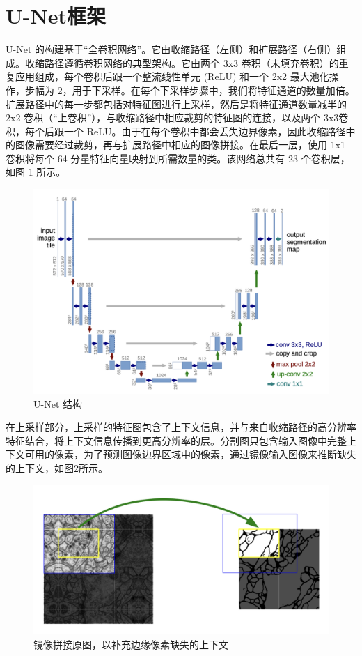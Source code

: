 \documentclass[letterpaper, 10pt, conference, twoside]{ieeeconf}
\begin{document}
\section{U-Net框架}
U-Net 的构建基于“全卷积网络”。它由收缩路径（左侧）和扩展路径（右侧）组成。收缩路径遵循卷积网络的典型架构。它由两个 3x3 卷积（未填充卷积）的重复应用组成，每个卷积后跟一个整流线性单元 (ReLU) 和一个 2x2 最大池化操作，步幅为 2，用于下采样。在每个下采样步骤中，我们将特征通道的数量加倍。扩展路径中的每一步都包括对特征图进行上采样，然后是将特征通道数量减半的 2x2 卷积（“上卷积”），与收缩路径中相应裁剪的特征图的连接，以及两个 3x3卷积，每个后跟一个 ReLU。由于在每个卷积中都会丢失边界像素，因此收缩路径中的图像需要经过裁剪，再与扩展路径中相应的图像拼接。在最后一层，使用 1x1 卷积将每个 64 分量特征向量映射到所需数量的类。该网络总共有 23 个卷积层，如图 1 所示。
\begin{figure}[htbp]
  \centering
  \includegraphics[width = 1\linewidth]{structure.png}
  \caption{U-Net 结构}
  \label{fig:fig1}
\end{figure}

在上采样部分，上采样的特征图包含了上下文信息，并与来自收缩路径的高分辨率特征结合，将上下文信息传播到更高分辨率的层。分割图只包含输入图像中完整上下文可用的像素，为了预测图像边界区域中的像素，通过镜像输入图像来推断缺失的上下文，如图2所示。

\begin{figure}[htbp]
  \centering
  \includegraphics[width = 1\linewidth]{seamless-seg.png}
  \caption{镜像拼接原图，以补充边缘像素缺失的上下文}
  \label{fig:fig2}
\end{figure}
\end{document}
